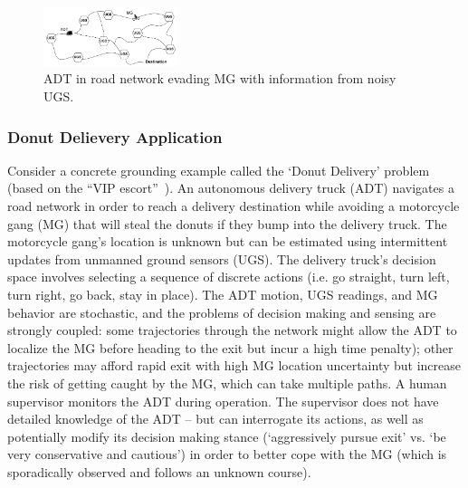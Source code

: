 	\begin{figure}[t]%
    	\centering
     	\includegraphics[width=0.35\textwidth]{Figures/RoadNet}
    	\caption{ADT in road network evading MG with information from noisy UGS.} 
        \label{fig:RoadNet}
        \vspace{-0.2cm}
    \end{figure}

\subsubsection{Donut Delievery Application} \label{sec:vip_escort}
Consider a concrete grounding example called the `Donut Delivery' problem (based on the ``VIP escort''~\cite{Humphrey2012-lr}). An autonomous delivery truck (ADT) navigates a road network in order to reach a delivery destination while avoiding a motorcycle gang (MG) that will steal the donuts if they bump into the delivery truck. The motorcycle gang's location is unknown but can be estimated using intermittent updates from unmanned ground sensors (UGS). The delivery truck's decision space involves selecting a sequence of discrete actions (i.e. go straight, turn left, turn right, go back, stay in place). The ADT motion, UGS readings, and MG behavior are stochastic, and the problems of decision making and sensing are strongly coupled: some trajectories through the network might allow the ADT to localize the MG before heading to the exit but incur a high time penalty); other trajectories may afford rapid exit with high MG location uncertainty but increase the risk of getting caught by the MG, which can take multiple paths. A human supervisor monitors the ADT during operation. The supervisor does not have detailed knowledge of the ADT -- but can interrogate its actions, as well as potentially modify its decision making stance (`aggressively pursue exit' vs. `be very conservative and cautious') in order to better cope with the MG (which is sporadically observed and follows an unknown course). 

